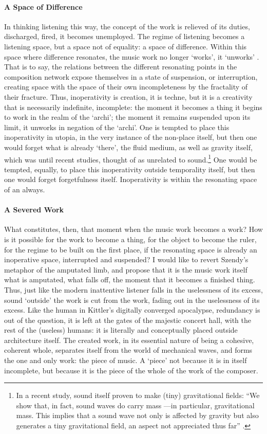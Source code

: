 \paragraph{A Space of Difference}
In thinking listening this way, the concept of the work is relieved of its duties, discharged, fired, it becomes unemployed. The regime of listening becomes a listening space, but a space not of equality: a space of difference. Within this space where difference resonates, the music work no longer `works', it `unworks' . That is to say, the relations between the different resonating points in the composition network expose themselves in a state of suspension, or interruption, creating space with the space of their own incompleteness by the fractality of their fracture. Thus, inoperativity is creation, it is techne, but it is a creativity that is necessarily indefinite, incomplete: the moment it becomes a thing it begins to work in the realm of the `archi'; the moment it remains suspended upon its limit, it unworks in negation of the `archi'. One is tempted to place this inoperativity in utopia, in the very instance of the non-place itself, but then one would forget what is already `there', the fluid medium, as well as gravity itself, which was until recent studies, thought of as unrelated to sound.\footnote{In a recent study, sound itself proven to make (tiny) gravitational fields: ``We show that, in fact, sound waves do carry mass ---in particular, gravitational mass. This implies that a sound wave not only is affected by gravity but also generates a tiny gravitational field, an aspect not appreciated thus far'' \parencite{PhysRevLett.122.084501}.} One would be tempted, equally, to place this inoperativity outside temporality itself, but then one would forget forgetfulness itself. Inoperativity is within the resonating space of an always.

\paragraph{A Severed Work}
What constitutes, then, that moment when the music work becomes a work? How is it possible for the work to become a thing, for the object to become the ruler, for the regime to be built on the first place, if the resonating space is already an inoperative space, interrupted and suspended? I would like to revert Szendy's metaphor of the amputated limb, and propose that it is the music work itself what is amputated, what falls off, the moment that it becomes a finished thing. Thus, just like the modern inattentive listener falls in the uselessness of its excess, sound `outside' the work is cut from the work, fading out in the uselessness of its excess. Like the human in Kittler's digitally converged apocalypse, redundancy is out of the question, it is left at the gates of the majestic concert hall, with the rest of the (useless) humans: it is literally and conceptually placed outside architecture itself. The created work, in its essential nature of being a cohesive, coherent whole, separates itself from the world of mechanical waves, and forms the one and only work: the piece of music. A `piece' not because it is in itself incomplete, but because it is the piece of the whole of the work of the composer.

